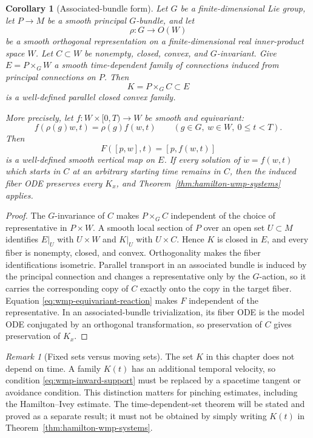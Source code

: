\documentclass[10pt]{coll-l}
\newtheorem{corollary}[theorem]{Corollary}
\theoremstyle{definition}
\theoremstyle{remark}
\newtheorem{remark}[theorem]{Remark}
\numberwithin{section}{chapter}
\numberwithin{equation}{chapter}
\begin{document}
\begin{corollary}[Associated-bundle form]
\label{cor:wmp-associated-bundle}
Let $G$ be a finite-dimensional Lie group, let $P\to M$ be a smooth
principal $G$-bundle, and let
\[
       \rho:G\longrightarrow O(W)
\]
be a smooth orthogonal representation on a finite-dimensional real
inner-product space $W$.  Let $C\subset W$ be nonempty, closed, convex, and
$G$-invariant.  Give $E=P\times_GW$ a smooth time-dependent family of
connections induced from principal connections on $P$.  Then
\[
       K=P\times_GC\subset E
\]
is a well-defined parallel closed convex family.

More precisely, let $f:W\times[0,T)\to W$ be smooth and equivariant:
\begin{equation}
 f(\rho(g)w,t)=\rho(g)f(w,t)
 \qquad(g\in G,\ w\in W,\ 0\leq t<T).                     \label{eq:wmp-equivariant-reaction}
\end{equation}
Then
\[
       F([p,w],t)=[p,f(w,t)]
\]
is a well-defined smooth vertical map on $E$.  If every solution of
$\dot w=f(w,t)$ which starts in $C$ at an arbitrary starting time remains
in $C$, then the induced fiber ODE preserves every $K_x$, and
Theorem~\ref{thm:hamilton-wmp-systems} applies.
\end{corollary}

\begin{proof}
The $G$-invariance of $C$ makes $P\times_GC$ independent of the choice of
representative in $P\times W$.  A smooth local section of $P$ over an open
set $U\subset M$ identifies $E|_U$ with $U\times W$ and $K|_U$ with
$U\times C$.  Hence $K$ is closed in $E$, and every fiber is nonempty,
closed, and convex.  Orthogonality makes the fiber identifications
isometric.  Parallel transport in an associated bundle is
induced by the principal connection and changes a representative only by the
$G$-action, so it carries the corresponding copy of $C$ exactly onto the
copy in the target fiber.  Equation
\eqref{eq:wmp-equivariant-reaction} makes $F$ independent of the
representative.  In an associated-bundle trivialization, its fiber ODE is
the model ODE conjugated by an orthogonal transformation, so preservation
of $C$ gives preservation of $K_x$.
\end{proof}

\begin{remark}[Fixed sets versus moving sets]
\label{rem:wmp-moving-sets}
The set $K$ in this chapter does not depend on time.  A family $K(t)$ has an
additional temporal velocity, so condition
\eqref{eq:wmp-inward-support} must be replaced by a spacetime tangent or
avoidance condition.  This distinction matters for pinching estimates,
including the Hamilton--Ivey estimate.  The time-dependent-set theorem will
be stated and proved as a separate result; it must not be obtained by simply
writing $K(t)$ in Theorem~\ref{thm:hamilton-wmp-systems}.
\end{remark}
\end{document}
